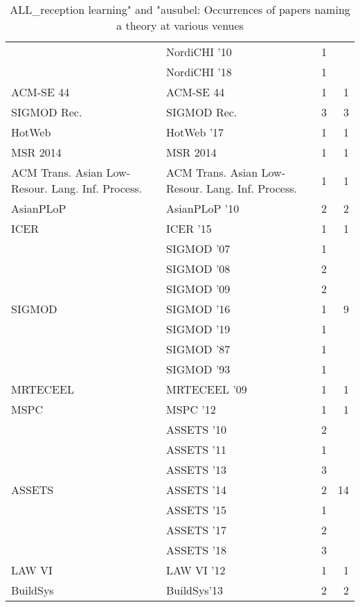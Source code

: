 \begin{table*}[t]
\begin{tabular}{llrr}
& NordiCHI '10 & 1 &\\
& NordiCHI '18 & 1 &\\
\multirow{1}{*}{ACM-SE 44} & ACM-SE 44 & 1 & \multirow{1}{*}{1}\\
\multirow{1}{*}{SIGMOD Rec.} & SIGMOD Rec. & 3 & \multirow{1}{*}{3}\\
\multirow{1}{*}{HotWeb } & HotWeb '17 & 1 & \multirow{1}{*}{1}\\
\multirow{1}{*}{MSR 2014} & MSR 2014 & 1 & \multirow{1}{*}{1}\\
\multirow{1}{*}{ACM Trans. Asian Low-Resour. Lang. Inf. Process.} & ACM Trans. Asian Low-Resour. Lang. Inf. Process. & 1 & \multirow{1}{*}{1}\\
\multirow{1}{*}{AsianPLoP } & AsianPLoP '10 & 2 & \multirow{1}{*}{2}\\
\multirow{1}{*}{ICER } & ICER '15 & 1 & \multirow{1}{*}{1}\\
\multirow{7}{*}{SIGMOD } & SIGMOD '07 & 1 & \multirow{7}{*}{9}\\
& SIGMOD '08 & 2 &\\
& SIGMOD '09 & 2 &\\
& SIGMOD '16 & 1 &\\
& SIGMOD '19 & 1 &\\
& SIGMOD '87 & 1 &\\
& SIGMOD '93 & 1 &\\
\multirow{1}{*}{MRTECEEL } & MRTECEEL '09 & 1 & \multirow{1}{*}{1}\\
\multirow{1}{*}{MSPC } & MSPC '12 & 1 & \multirow{1}{*}{1}\\
\multirow{7}{*}{ASSETS } & ASSETS '10 & 2 & \multirow{7}{*}{14}\\
& ASSETS '11 & 1 &\\
& ASSETS '13 & 3 &\\
& ASSETS '14 & 2 &\\
& ASSETS '15 & 1 &\\
& ASSETS '17 & 2 &\\
& ASSETS '18 & 3 &\\
\multirow{1}{*}{LAW VI } & LAW VI '12 & 1 & \multirow{1}{*}{1}\\
\multirow{1}{*}{BuildSys} & BuildSys'13 & 2 & \multirow{1}{*}{2}\\
\end{tabular}
\caption{ALL\_reception learning" and "ausubel: Occurrences of papers naming a theory at various venues}
\end{table*}